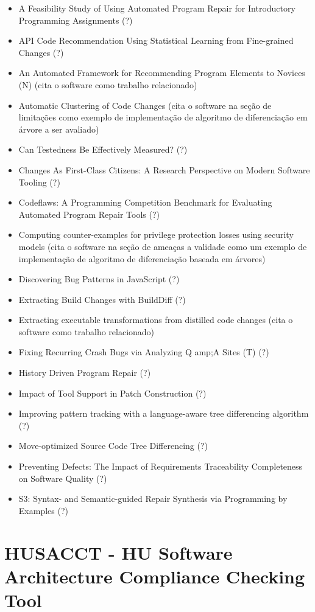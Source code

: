 \begin{itemize}
\item A Feasibility Study of Using Automated Program Repair for Introductory Programming Assignments (?)
\item API Code Recommendation Using Statistical Learning from Fine-grained Changes (?)
\item An Automated Framework for Recommending Program Elements to Novices (N) (cita o software como trabalho relacionado)
\item Automatic Clustering of Code Changes (cita o software na seção de limitações como exemplo de implementação de algoritmo de diferenciação em árvore a ser avaliado)
\item Can Testedness Be Effectively Measured? (?)
\item Changes As First-Class Citizens: A Research Perspective on Modern Software Tooling (?)
\item Codeflaws: A Programming Competition Benchmark for Evaluating Automated Program Repair Tools (?)
\item Computing counter-examples for privilege protection losses using security models (cita o software na seção de ameaças a validade como um exemplo de implementação de algoritmo de diferenciação baseada em árvores)
\item Discovering Bug Patterns in JavaScript (?)
\item Extracting Build Changes with BuildDiff (?)
\item Extracting executable transformations from distilled code changes (cita o software como trabalho relacionado)
\item Fixing Recurring Crash Bugs via Analyzing Q amp;A Sites (T) (?)
\item History Driven Program Repair (?)
\item Impact of Tool Support in Patch Construction (?)
\item Improving pattern tracking with a language-aware tree differencing algorithm (?)
\item Move-optimized Source Code Tree Differencing (?)
\item Preventing Defects: The Impact of Requirements Traceability Completeness on Software Quality (?)
\item S3: Syntax- and Semantic-guided Repair Synthesis via Programming by Examples (?)
\end{itemize}

\section{HUSACCT - HU Software Architecture Compliance Checking Tool}

